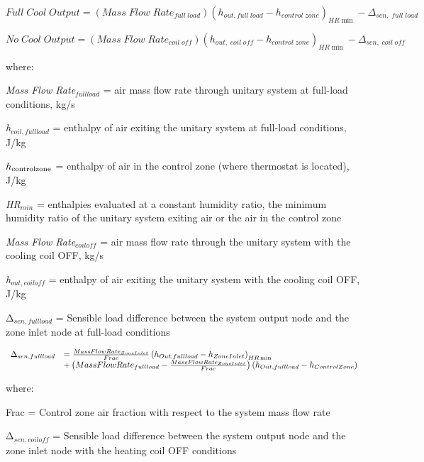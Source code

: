 \begin{equation}
Full\;Cool\;Output = (Mass\;Flow\;Rat{e_{full\;load}}){({h_{out,full\;load}} - {h_{control\;zone}})_{HR\min }} - {\Delta_{sen,\;full\;load}}
\end{equation}

\begin{equation}
No\;Cool\;Output = (Mass\;Flow\;Rat{e_{coil\;off}}){({h_{out,\;coil\;off}} - {h_{control\;zone}})_{HR\min }} - {\Delta_{sen,\;coil\;off}}
\end{equation}

where:

\emph{Mass Flow Rate\(_{full load}\)} = air mass flow rate through unitary system at full-load conditions, kg/s

\emph{h\(_{coil, full load}\)} = enthalpy of air exiting the unitary system at full-load conditions, J/kg

\(h_{\rm{control zone}}\) = enthalpy of air in the control zone (where thermostat is located), J/kg

\emph{HR\(_{min}\)} = enthalpies evaluated at a constant humidity ratio, the minimum humidity ratio of the unitary system exiting air or the air in the control zone

\emph{Mass Flow Rate\(_{coil off}\)} = air mass flow rate through the unitary system with the cooling coil OFF, kg/s

\emph{h\(_{out,coil off}\)} = enthalpy of air exiting the unitary system with the cooling coil OFF, J/kg

Δ\(_{sen,full load}\) = Sensible load difference between the system output node and the zone inlet node at full-load conditions

\begin{equation}
  \begin{array}{rl}
    \Delta_{sen,full load} &= \frac{MassFlowRate_{ZoneInlet}}{Frac} \PB{h_{Out,full load} - h_{ZoneInlet}}_{HR\min} \\
                           &+ \PB{MassFlowRate_{full load} - \frac{MassFlowRate_{ZoneInlet}}{Frac}} \PB{ h_{Out,full load} - h_{ControlZone}}
  \end{array}
\end{equation}

where:

Frac = Control zone air fraction with respect to the system mass flow rate

Δ\(_{sen,coil off}\) = Sensible load difference between the system output node and the zone inlet node with the heating coil OFF conditions

